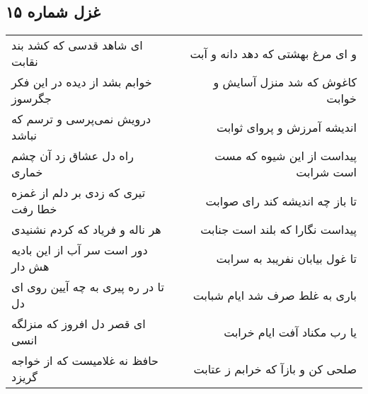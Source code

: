 \begin{center}
\section*{غزل شماره ۱۵}
\label{sec:sh015}
\begin{longtable}{l p{0.5cm} r}
ای شاهد قدسی که کشد بند نقابت
&&
و ای مرغ بهشتی که دهد دانه و آبت
\\
خوابم بشد از دیده در این فکر جگرسوز
&&
کاغوش که شد منزل آسایش و خوابت
\\
درویش نمی‌پرسی و ترسم که نباشد
&&
اندیشه آمرزش و پروای ثوابت
\\
راه دل عشاق زد آن چشم خماری
&&
پیداست از این شیوه که مست است شرابت
\\
تیری که زدی بر دلم از غمزه خطا رفت
&&
تا باز چه اندیشه کند رای صوابت
\\
هر ناله و فریاد که کردم نشنیدی
&&
پیداست نگارا که بلند است جنابت
\\
دور است سر آب از این بادیه هش دار
&&
تا غول بیابان نفریبد به سرابت
\\
تا در ره پیری به چه آیین روی ای دل
&&
باری به غلط صرف شد ایام شبابت
\\
ای قصر دل افروز که منزلگه انسی
&&
یا رب مکناد آفت ایام خرابت
\\
حافظ نه غلامیست که از خواجه گریزد
&&
صلحی کن و بازآ که خرابم ز عتابت
\\
\end{longtable}
\end{center}
